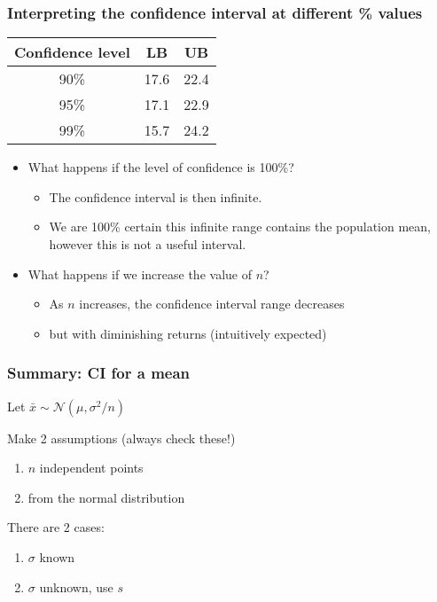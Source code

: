 \begin{frame}\frametitle{Interpreting the confidence interval at different \% values}

	\begin{center}
		\begin{tabular}{c|cc}
			\textbf{Confidence level} & \textbf{LB} & \textbf{UB}\\ \hline
			90\%	& 17.6	&	22.4\\
			95\%	& 17.1	&	22.9\\
			99\%	& 15.7	&	24.2\\
		\end{tabular}
	\end{center}
	\begin{itemize}
		\item	What happens if the level of confidence is 100\%? 
		\begin{itemize}
			\item	The confidence interval is then infinite.
			\item	We are 100\% certain this infinite range contains the population mean, however this is not a useful interval.
		\end{itemize}
		\item	What happens if we increase the value of $n$? 
		\begin{itemize}
			\item	As $n$ increases, the confidence interval range decreases
			\item	but with diminishing returns (intuitively expected)
		\end{itemize}
	\end{itemize}
\end{frame}

\begin{frame}\frametitle{Summary: CI for a mean}

	Let $\bar{x} \sim \mathcal{N}(\mu, \sigma^2/n)$

	Make 2 assumptions (always check these!)
	\begin{enumerate}
		\item	$n$ independent points
		\item	from the normal distribution \hfill {\color{myOrange}{$\longleftarrow$ not required if $\sigma$ known}}
	\end{enumerate}

	There are 2 cases:
	\begin{enumerate}
		\item	$\sigma$ known
		\item	$\sigma$ unknown, use $s$
	\end{enumerate}
\end{frame}


